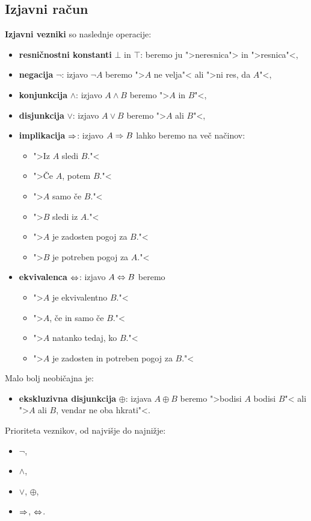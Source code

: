 \subsection{Izjavni račun}

\textbf{Izjavni vezniki} so naslednje operacije:
%
\begin{itemize}

\item \textbf{resničnostni konstanti} $\bot$ in $\top$: beremo ju ">neresnica"> in ">resnica"<,

\item \textbf{negacija} $\neg$: izjavo $\neg A$ beremo ">$A$ ne velja"< ali ">ni res, da $A$"<,

\item \textbf{konjunkcija} $\land$: izjavo $A \land B$ beremo ">$A$ in $B$"<,

\item \textbf{disjunkcija} $\lor$: izjavo $A \lor B$ beremo ">$A$ ali $B$"<,

\item \textbf{implikacija} $\Rightarrow$: izjavo $A \Rightarrow B$ lahko beremo na več načinov:
  \begin{itemize}
  \item ">Iz $A$ sledi $B$."<
  \item ">Če $A$, potem $B$."<
  \item ">$A$ samo če $B$."<
  \item ">$B$ sledi iz $A$."<
  \item ">$A$ je zadosten pogoj za $B$."<
  \item ">$B$ je potreben pogoj za $A$."<
  \end{itemize}
\item \textbf{ekvivalenca} $\Leftrightarrow$: izjavo $A \Leftrightarrow B$ beremo
  \begin{itemize}
  \item ">$A$ je ekvivalentno $B$."<
  \item ">$A$, če in samo če $B$."<
  \item ">$A$ natanko tedaj, ko $B$."<
  \item ">$A$ je zadosten in potreben pogoj za $B$."<
  \end{itemize}
\end{itemize}
%
Malo bolj neobičajna je:
%
\begin{itemize}
\item \textbf{ekskluzivna disjunkcija} $\oplus$: izjava $A \oplus B$ beremo ">bodisi $A$ bodisi $B$"< ali ">$A$ ali $B$, vendar ne oba hkrati"<.
\end{itemize}
%
Prioriteta veznikov, od najvišje do najnižje:
%
\begin{itemize}
\item $\neg$,
\item $\land$,
\item $\lor$, $\oplus$,
\item $\Rightarrow$, $\Leftrightarrow$.
\end{itemize}


